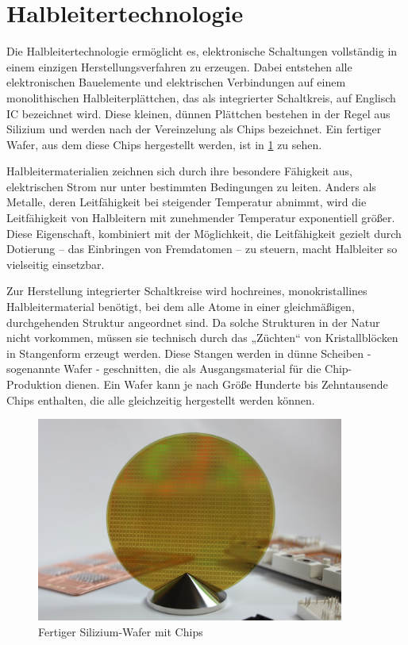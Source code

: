 \section{Halbleitertechnologie}

Die Halbleitertechnologie ermöglicht es, elektronische Schaltungen vollständig in einem einzigen Herstellungsverfahren zu erzeugen. Dabei entstehen alle elektronischen Bauelemente und elektrischen Verbindungen auf einem monolithischen Halbleiterplättchen, das als integrierter Schaltkreis, auf Englisch \gls{IC} bezeichnet wird. Diese kleinen, dünnen Plättchen bestehen in der Regel aus Silizium und werden nach der Vereinzelung als Chips bezeichnet. Ein fertiger Wafer, aus dem diese Chips hergestellt werden, ist in \ref{fig:Silizium-Wafer} zu sehen.

Halbleitermaterialien zeichnen sich durch ihre besondere Fähigkeit aus, elektrischen Strom nur unter bestimmten Bedingungen zu leiten. Anders als Metalle, deren Leitfähigkeit bei steigender Temperatur abnimmt, wird die Leitfähigkeit von Halbleitern mit zunehmender Temperatur exponentiell größer. Diese Eigenschaft, kombiniert mit der Möglichkeit, die Leitfähigkeit gezielt durch Dotierung – das Einbringen von Fremdatomen – zu steuern, macht Halbleiter so vielseitig einsetzbar.

Zur Herstellung integrierter Schaltkreise wird hochreines, monokristallines Halbleitermaterial benötigt, bei dem alle Atome in einer gleichmäßigen, durchgehenden Struktur angeordnet sind. Da solche Strukturen in der Natur nicht vorkommen, müssen sie technisch durch das „Züchten“ von Kristallblöcken in Stangenform erzeugt werden. Diese Stangen werden in dünne Scheiben - sogenannte Wafer - geschnitten, die als Ausgangsmaterial für die Chip-Produktion dienen. Ein Wafer kann je nach Größe Hunderte bis Zehntausende Chips enthalten, die alle gleichzeitig hergestellt werden können.

\begin{figure}[!h]
    \centering
    \includegraphics[width=0.9\textwidth]{bilder/SiC-Wafer-Infineon.jpg}
    \caption{Fertiger Silizium-Wafer mit Chips \cite{infineon2024dünnsterWafer}}
    \label{fig:Silizium-Wafer}
\end{figure}

